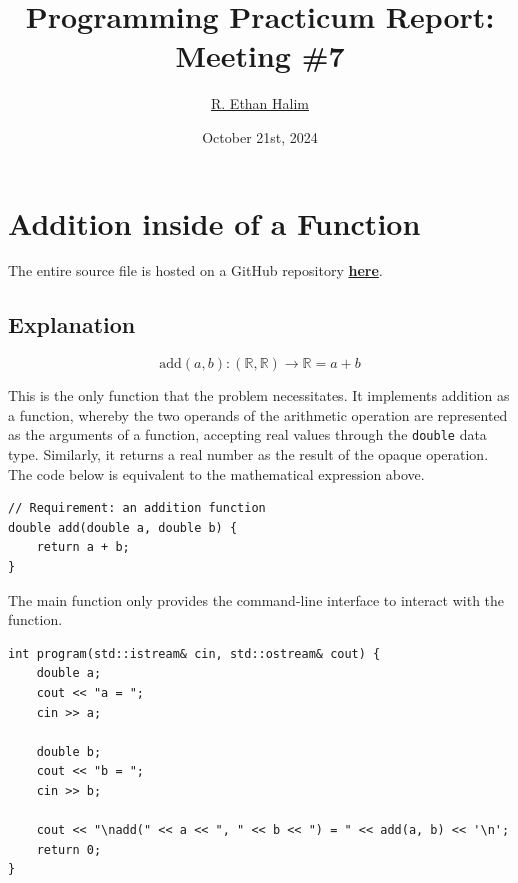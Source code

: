 \documentclass[12pt]{article}
\title{Programming Practicum Report:\\Meeting \#7}
\author{\href{https://github.com/avaxar}{R. Ethan Halim}}
\date{October 21st, 2024}
\begin{document}
\maketitle

\section{Addition inside of a Function}
The entire source file is hosted on a GitHub repository \href{https://github.com/avaxar/uni-practica-1/tree/main/week_7/01_addition}{\textbf{here}}.

\subsection{Explanation}

$$\text{add}(a, b) : (\mathbb{R}, \mathbb{R}) \rightarrow \mathbb{R} = a + b$$

This is the only function that the problem necessitates. It implements addition as a function, whereby the two operands of the arithmetic operation are represented as the arguments of a function, accepting real values through the \texttt{double} data type. Similarly, it returns a real number as the result of the opaque operation. The code below is equivalent to the mathematical expression above.

\begin{verbatim}
// Requirement: an addition function
double add(double a, double b) {
    return a + b;
}
\end{verbatim}

The main function only provides the command-line interface to interact with the function.

\begin{verbatim}
int program(std::istream& cin, std::ostream& cout) {
    double a;
    cout << "a = ";
    cin >> a;

    double b;
    cout << "b = ";
    cin >> b;

    cout << "\nadd(" << a << ", " << b << ") = " << add(a, b) << '\n';
    return 0;
}
\end{verbatim}

\end{document}
